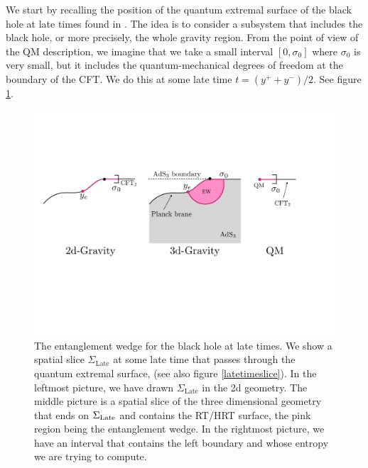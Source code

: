 \documentclass[12pt]{article}
\begin{document}
We start by recalling the position of the quantum extremal surface of the black hole at late times found in  \cite{Penington:2019npb,Almheiri:2019psf}. 
The idea is to consider a subsystem that includes the black hole, or more precisely, the whole gravity region.
From the point of view of the QM description, we imagine that we take a small interval $[0,\sigma_0]$ where $\sigma_0$ is very small, but it includes the quantum-mechanical degrees of freedom at the boundary of the CFT. 
We do this at some late time $t = (y^+ + y^-)/2$.
See figure \ref{LateEntanglementWedges}. 
\begin{figure}[ht]
    \begin{center}
    \includegraphics[scale=.5]{Figures/LateEntanglementWedges}
    \end{center}
    \caption{
     The entanglement wedge for the black hole at late times. 
     We show a spatial slice $\Sigma_\text{Late}$ at some late time that passes through the quantum extremal surface, (see also figure \ref{latetimeslice}).
     In the leftmost picture, we have drawn $\Sigma_\text{Late}$ in the 2d geometry.
     The middle picture is a spatial slice of the three dimensional geometry that ends on $\Sigma_{\rm Late}$ and contains the RT/HRT surface, the pink region being the entanglement wedge. 
     In the rightmost picture, we have an interval that contains the left boundary and whose entropy we are trying to compute.}
    \label{LateEntanglementWedges}
\end{figure}
\end{document}

